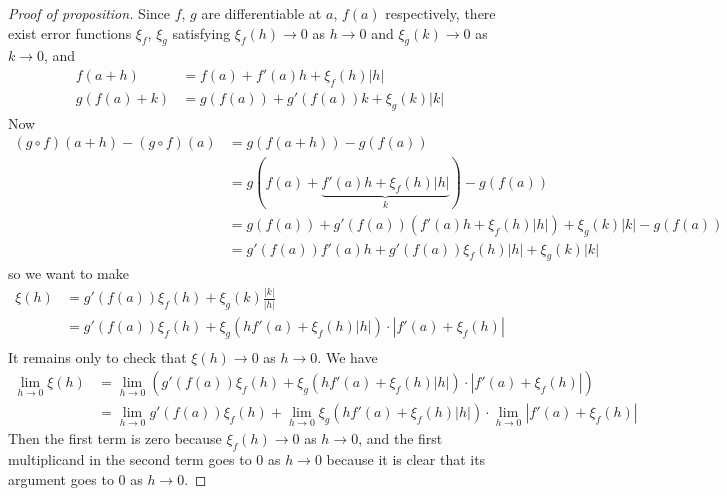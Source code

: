 \documentclass{../template/note}
\begin{document}
    \begin{proof}[Proof of proposition]
        Since \(f\), \(g\) are differentiable at \(a\), \(f(a)\) respectively, there exist error functions \(\xi_f\), \(\xi_g\) satisfying \(\xi_f(h) \to 0\) as \(h \to 0\) and \(\xi_g(k) \to 0\) as \(k \to 0\), and
        \begin{align*}
            f(a+h) &= f(a) + f'(a)h + \xi_f(h)|h| \\
            g(f(a)+k) &= g(f(a)) + g'(f(a))k + \xi_g(k)|k|
        \end{align*}
        Now
        \begin{align*}
            (g \circ f)(a+h) - (g \circ f)(a) &= g(f(a+h)) - g(f(a)) \\
            &= g(f(a) + \underbrace{f'(a)h + \xi_f(h)|h|}_k) - g(f(a)) \\
            &= g(f(a)) + g'(f(a))\left(f'(a)h + \xi_f(h)|h|\right) + \xi_g(k)|k| - g(f(a)) \\
            &= g'(f(a))f'(a)h + g'(f(a))\xi_f(h)|h| + \xi_g(k)|k|
        \end{align*}
        so we want to make
        \begin{align*}
            \xi(h) &= g'(f(a))\xi_f(h) + \xi_g(k)\frac{|k|}{|h|} \\
            &= g'(f(a))\xi_f(h) + \xi_g(hf'(a)+\xi_f(h)|h|)\cdot|f'(a)+\xi_f(h)| \\
        \end{align*}
        It remains only to check that \(\xi(h) \to 0\) as \(h \to 0\). We have
        \begin{align*}
            \lim_{h \to 0} \xi(h) &= \lim_{h \to 0} \left(g'(f(a))\xi_f(h) + \xi_g(hf'(a)+\xi_f(h)|h|)\cdot|f'(a)+\xi_f(h)|\right) \\
            &= \lim_{h \to 0} g'(f(a))\xi_f(h) + \lim_{h \to 0} \xi_g(hf'(a)+\xi_f(h)|h|) \cdot \lim_{h \to 0} |f'(a)+\xi_f(h)|
        \end{align*}
        Then the first term is zero because \(\xi_f(h) \to 0\) as \(h \to 0\), and the first multiplicand in the second term goes to 0 as \(h \to 0\) because it is clear that its argument goes to 0 as \(h \to 0\).
    \end{proof}
    
\end{document}
